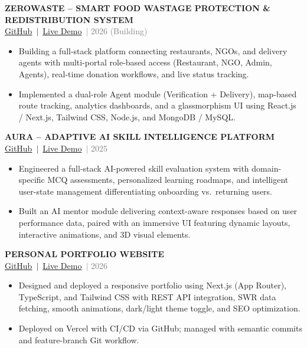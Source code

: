 \documentclass[a4paper,10pt]{article}
\newcommand{\rItem}[1]{\item\small#1}
\begin{document}
\vspace{2pt}
{\bfseries\small ZEROWASTE -- SMART FOOD WASTAGE PROTECTION \& REDISTRIBUTION SYSTEM}\\[1pt]
{\footnotesize\href{https://github.com/Abhisly/ZeroWaste}{GitHub}~$|$~\href{https://zero-waste-puce.vercel.app/}{Live Demo}~\textcolor{graytext}{$|$ 2026 (Building)}}
\begin{itemize}
  \rItem{Building a full-stack platform connecting restaurants, NGOs, and delivery agents with multi-portal role-based access (Restaurant, NGO, Admin, Agents), real-time donation workflows, and live status tracking.}
  \rItem{Implemented a dual-role Agent module (Verification + Delivery), map-based route tracking, analytics dashboards, and a glassmorphism UI using React.js / Next.js, Tailwind CSS, Node.js, and MongoDB / MySQL.}
\end{itemize}

\vspace{2pt}
{\bfseries\small AURA -- ADAPTIVE AI SKILL INTELLIGENCE PLATFORM}\\[1pt]
{\footnotesize\href{https://github.com/Abhisly/AURA}{GitHub}~$|$~\href{https://aura-five-omega.vercel.app/}{Live Demo}~\textcolor{graytext}{$|$ 2025}}
\begin{itemize}
  \rItem{Engineered a full-stack AI-powered skill evaluation system with domain-specific MCQ assessments, personalized learning roadmaps, and intelligent user-state management differentiating onboarding vs.\ returning users.}
  \rItem{Built an AI mentor module delivering context-aware responses based on user performance data, paired with an immersive UI featuring dynamic layouts, interactive animations, and 3D visual elements.}
\end{itemize}

\vspace{2pt}
{\bfseries\small PERSONAL PORTFOLIO WEBSITE}\\[1pt]
{\footnotesize\href{https://github.com/Abhisly/PORTFOLIO}{GitHub}~$|$~\href{https://portfolio-nu-sage-28.vercel.app/}{Live Demo}~\textcolor{graytext}{$|$ 2026}}
\begin{itemize}
  \rItem{Designed and deployed a responsive portfolio using Next.js (App Router), TypeScript, and Tailwind CSS with REST API integration, SWR data fetching, smooth animations, dark/light theme toggle, and SEO optimization.}
  \rItem{Deployed on Vercel with CI/CD via GitHub; managed with semantic commits and feature-branch Git workflow.}
\end{itemize}
\end{document}
